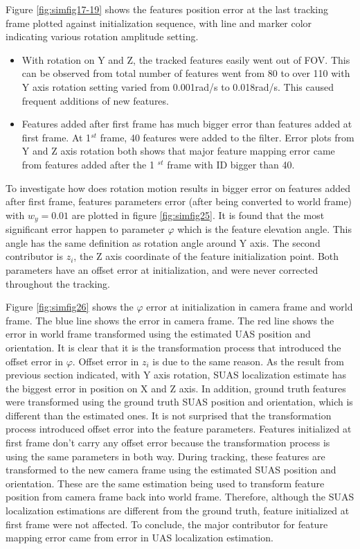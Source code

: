Figure \ref{fig:simfig17-19} shows the features position error at the
last tracking frame plotted against initialization sequence, with line
and marker color indicating various rotation amplitude setting.

\begin{itemize}
  \item With rotation on Y and Z, the tracked features easily went out
  of FOV. This can be observed from total number of features went from
  80 to over 110 with Y axis rotation setting varied from 0.001rad/s
  to 0.018rad/s. This caused frequent additions of new features.
  \item Features added after first frame has much bigger error than
  features added at first frame. At 1$^{st}$ frame, 40 features were added
  to the filter. Error plots from Y and Z axis rotation both shows
  that major feature mapping error came from features added after the
  1 $^{st}$ frame with ID bigger than 40.
\end{itemize}
\FloatBarrier

To investigate how does rotation motion results in bigger error on
features added after first frame, features parameters error (after
being converted to world frame) with $w_y = 0.01$ are plotted in
figure \ref{fig:simfig25}. It is found that the most significant error
happen to parameter $\varphi$ which is the feature elevation angle. This
angle has the same definition as rotation angle around Y axis. The
second contributor is $z_i$, the Z axis coordinate of the feature
initialization point. Both parameters have an offset error at
initialization, and were never corrected throughout the tracking.

Figure \ref{fig:simfig26} shows the $\varphi$ error at initialization
in camera frame and world frame. The blue line shows the error in
camera frame. The red line shows the error in world frame transformed
using the estimated UAS position and orientation. It is clear that it
is the transformation process that introduced the offset error in
$\varphi$. Offset error in $z_i$ is due to the same reason. As the
result from previous section indicated, with Y axis rotation, SUAS
localization estimate has the biggest error in position on X and Z
axis. In addition, ground truth features were transformed using the
ground truth SUAS position and orientation, which is different than
the estimated ones. It is not surprised that the transformation
process introduced offset error into the feature parameters. Features
initialized at first frame don't carry any offset error because the
transformation process is using the same parameters in both way.
During tracking, these features are transformed to the new camera
frame using the estimated SUAS position and orientation. These are the
same estimation being used to transform feature position from camera
frame back into world frame. Therefore, although the SUAS localization
estimations are different from the ground truth, feature initialized
at first frame were not affected. To conclude, the major contributor
for feature mapping error came from error in UAS localization
estimation.

